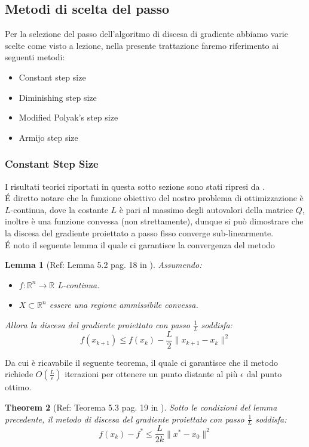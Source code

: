 \documentclass[12pt]{extarticle}
\newtheorem{theorem}{Theorem}[section]
\newtheorem{lemma}[theorem]{Lemma}
\begin{document}
\subsection{Metodi di scelta del passo}
Per la selezione del passo dell'algoritmo di discesa di gradiente abbiamo varie scelte come visto a lezione, nella presente trattazione faremo riferimento ai seguenti metodi:
\begin{itemize}
    \item Constant step size
    \item Diminishing step size
    \item Modified Polyak's step size
    \item Armijo step size
\end{itemize}
\subsubsection{Constant Step Size}
I risultati teorici riportati in questa sotto sezione sono stati ripresi da \cite{notesfirstom}.\\
\'E diretto notare che la funzione obiettivo del nostro problema di ottimizzazione è $L$-continua, dove la costante $L$ è pari al massimo degli autovalori della matrice $Q$, inoltre è una funzione convessa (non strettamente), dunque si può dimostrare che la discesa del gradiente proiettato a passo fisso converge sub-linearmente.\\
\'E noto il seguente lemma il quale ci garantisce la convergenza del metodo
\begin{lemma}[Ref: Lemma 5.2 pag. 18 in \cite{notesfirstom}]
Assumendo:
\begin{itemize}
    \item $f : \mathbb{R}^n \to \mathbb{R}$ L-continua.
    \item $X \subset \mathbb{R}^n$ essere una regione ammissibile convessa.
\end{itemize}
Allora la discesa del gradiente proiettato con passo $\frac{1}{L}$ soddisfa:
\[f(x_{k+1}) \leq f(x_k) - \frac{L}{2}\|x_{k+1} - x_k\|^2 \]
\end{lemma}
Da cui è ricavabile il seguente teorema, il quale ci garantisce che il metodo richiede $O(\frac{L}{\epsilon})$ iterazioni per ottenere un punto distante al più $\epsilon$ dal punto ottimo.
\begin{theorem}[Ref: Teorema 5.3 pag. 19 in \cite{notesfirstom}]
Sotto le condizioni del lemma precedente, il metodo di discesa del gradiente proiettato con passo $\frac{1}{L}$ soddisfa:
\[f(x_k) - f^* \leq \frac{L}{2k}\| x^* - x_0 \|^2\]
\end{theorem}
\end{document}
